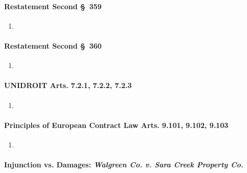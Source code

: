 \paragraph{Restatement Second \S\ 359}

\begin{enumerate}
    \item %
\end{enumerate}

\paragraph{Restatement Second \S\ 360}

\begin{enumerate}
    \item %
\end{enumerate}

\paragraph{UNIDROIT Arts. 7.2.1, 7.2.2, 7.2.3}

\begin{enumerate}
    \item %
\end{enumerate}

\paragraph{Principles of European Contract Law Arts. 9.101, 9.102, 9.103}

\begin{enumerate}
    \item %
\end{enumerate}

\paragraph{Injunction vs. Damages: \emph{Walgreen Co. v. Sara Creek Property 
Co.}}


